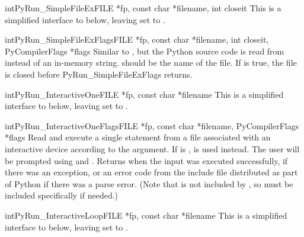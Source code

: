 \begin{cfuncdesc}{int}{PyRun_SimpleFileEx}{FILE *fp, const char *filename,
                                           int closeit}
  This is a simplified interface to 
  below, leaving  set to \NULL.
\end{cfuncdesc}

\begin{cfuncdesc}{int}{PyRun_SimpleFileExFlags}{FILE *fp, const char *filename,
                                                int closeit,
                                                PyCompilerFlags *flags}
  Similar to , but the Python source
  code is read from  instead of an in-memory string.
   should be the name of the file.  If  is
  true, the file is closed before PyRun_SimpleFileExFlags returns.
\end{cfuncdesc}

\begin{cfuncdesc}{int}{PyRun_InteractiveOne}{FILE *fp, const char *filename}
  This is a simplified interface to 
  below, leaving  set to \NULL.
\end{cfuncdesc}

\begin{cfuncdesc}{int}{PyRun_InteractiveOneFlags}{FILE *fp,
                                                  const char *filename,
                                                  PyCompilerFlags *flags}
  Read and execute a single statement from a file associated with an
  interactive device according to the  argument.  If
   is \NULL,  is used instead.  The user will
  be prompted using  and .  Returns 
  when the input was executed successfully,  if there was an
  exception, or an error code from the  include file
  distributed as part of Python if there was a parse error.  (Note that
   is not included by , so must be included
  specifically if needed.)
\end{cfuncdesc}

\begin{cfuncdesc}{int}{PyRun_InteractiveLoop}{FILE *fp, const char *filename}
  This is a simplified interface to 
  below, leaving  set to \NULL.
\end{cfuncdesc}

